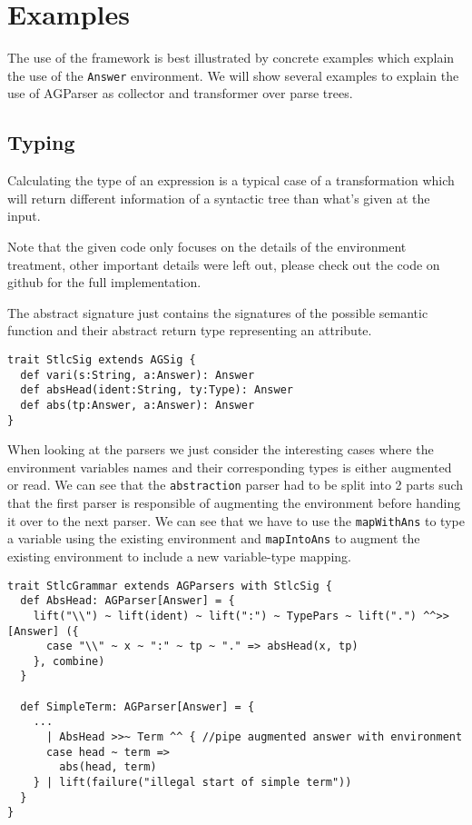 \section{Examples}
The use of the framework is best illustrated by concrete examples which explain the use of the \verb/Answer/ environment. We will show several examples to explain the use of AGParser as collector and transformer over parse trees.

\subsection{Typing}
Calculating the type of an expression is a typical case of a transformation which will return different information of a syntactic tree than what's given at the input.

Note that the given code only focuses on the details of the environment treatment, other important details were left out, please check out the code on github for the full implementation.

The abstract signature just contains the signatures of the possible semantic function and their abstract return type representing an attribute.
\begin{lstlisting}
trait StlcSig extends AGSig {
  def vari(s:String, a:Answer): Answer
  def absHead(ident:String, ty:Type): Answer
  def abs(tp:Answer, a:Answer): Answer
}
\end{lstlisting}

When looking at the parsers we just consider the interesting cases where the environment variables names and their corresponding types is either augmented or read. We can see that the \verb/abstraction/ parser had to be split into 2 parts such that the first parser is responsible of augmenting the environment before handing it over to the next parser.
We can see that we have to use the \verb/mapWithAns/ to type a variable using the existing environment and \verb/mapIntoAns/ to augment the existing environment to include a new variable-type mapping.

\begin{lstlisting}
trait StlcGrammar extends AGParsers with StlcSig {
  def AbsHead: AGParser[Answer] = {
    lift("\\") ~ lift(ident) ~ lift(":") ~ TypePars ~ lift(".") ^^>>[Answer] ({
      case "\\" ~ x ~ ":" ~ tp ~ "." => absHead(x, tp)
    }, combine)
  }

  def SimpleTerm: AGParser[Answer] = {
    ...
      | AbsHead >>~ Term ^^ { //pipe augmented answer with environment
      case head ~ term =>
        abs(head, term)
    } | lift(failure("illegal start of simple term"))
  }
}
\end{lstlisting}

